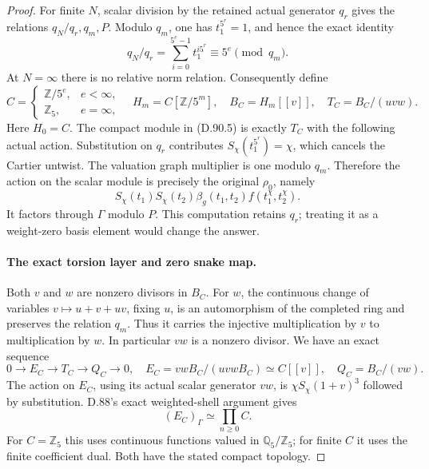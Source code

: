 \begin{proof}
For finite \(N\), scalar division by the retained actual
generator \(q_r\) gives the relations
\(q_N/q_r,q_m,P\). Modulo \(q_m\), one has
\(t_1^{5^r}=1\), and hence the exact identity
\[
               q_N/q_r=\sum_{i=0}^{5^e-1}t_1^{i5^r}
                              \equiv5^e\pmod{q_m}.     \tag{D.90.6}
\]
At \(N=\infty\) there is no relative norm relation.
Consequently define
\[
 C=\begin{cases}\mathbb Z/5^e,&e<\infty,\\
                \mathbb Z_5,&e=\infty,\end{cases}
 \quad H_m=C[\mathbb Z/5^m],\quad
 B_C=H_m[[v]],\quad T_C=B_C/(uvw).                      \tag{D.90.7}
\]
Here \(H_0=C\). The compact module in (D.90.5) is
exactly \(T_C\) with the following actual action.
Substitution on \(q_r\) contributes
\(S_\chi(t_1^{5^r})=\chi\), which cancels the Cartier
untwist. The valuation graph multiplier is one modulo
\(q_m\). Therefore the action on the scalar module is
precisely the original \(\rho_0\), namely
\[
     S_\chi(t_1)S_\chi(t_2)\beta_g(t_1,t_2)
                            f(t_1^\chi,t_2^\chi).      \tag{D.90.8}
\]
It factors through \(\Gamma\) modulo \(P\).
This computation retains \(q_r\); treating it as a
weight-zero basis element would change the answer.

\paragraph{The exact torsion layer and zero snake map.}
Both \(v\) and \(w\) are nonzero divisors in \(B_C\).
For \(w\), the continuous change of variables
\(v\mapsto u+v+uv\), fixing \(u\), is an automorphism
of the completed ring and preserves the relation \(q_m\).
Thus it carries the injective multiplication by \(v\)
to multiplication by \(w\). In particular \(vw\)
is a nonzero divisor. We have an exact sequence
\[
 0\longrightarrow E_C\longrightarrow T_C\longrightarrow Q_C
                 \longrightarrow0,
 \quad E_C=vwB_C/(uvwB_C)\simeq C[[v]],
 \quad Q_C=B_C/(vw).                                    \tag{D.90.9}
\]
The action on \(E_C\), using its actual scalar generator
\(vw\), is \(\chi S_\chi(1+v)^3\) followed by
substitution. D.88's exact weighted-shell argument gives
\[
                         (E_C)_\Gamma\simeq\prod_{n\ge0}C.
                                                               \tag{D.90.10}
\]
For \(C=\mathbb Z_5\) this uses continuous functions valued
in \(\mathbb Q_5/\mathbb Z_5\); for finite \(C\) it uses
the finite coefficient dual. Both have the stated compact topology.


\end{proof}

